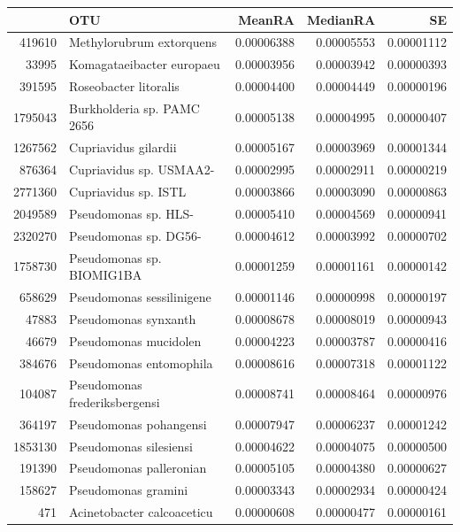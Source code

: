\begin{table}[ht]
\centering
\begin{tabular}{rlrrr}
  \hline
 & OTU & MeanRA & MedianRA & SE \\ 
  \hline
419610 & Methylorubrum extorquens & 0.00006388 & 0.00005553 & 0.00001112 \\ 
  33995 & Komagataeibacter europaeu & 0.00003956 & 0.00003942 & 0.00000393 \\ 
  391595 & Roseobacter litoralis & 0.00004400 & 0.00004449 & 0.00000196 \\ 
  1795043 & Burkholderia sp. PAMC 2656 & 0.00005138 & 0.00004995 & 0.00000407 \\ 
  1267562 & Cupriavidus gilardii & 0.00005167 & 0.00003969 & 0.00001344 \\ 
  876364 & Cupriavidus sp. USMAA2- & 0.00002995 & 0.00002911 & 0.00000219 \\ 
  2771360 & Cupriavidus sp. ISTL & 0.00003866 & 0.00003090 & 0.00000863 \\ 
  2049589 & Pseudomonas sp. HLS- & 0.00005410 & 0.00004569 & 0.00000941 \\ 
  2320270 & Pseudomonas sp. DG56- & 0.00004612 & 0.00003992 & 0.00000702 \\ 
  1758730 & Pseudomonas sp. BIOMIG1BA & 0.00001259 & 0.00001161 & 0.00000142 \\ 
  658629 & Pseudomonas sessilinigene & 0.00001146 & 0.00000998 & 0.00000197 \\ 
  47883 & Pseudomonas synxanth & 0.00008678 & 0.00008019 & 0.00000943 \\ 
  46679 & Pseudomonas mucidolen & 0.00004223 & 0.00003787 & 0.00000416 \\ 
  384676 & Pseudomonas entomophila & 0.00008616 & 0.00007318 & 0.00001122 \\ 
  104087 & Pseudomonas frederiksbergensi & 0.00008741 & 0.00008464 & 0.00000976 \\ 
  364197 & Pseudomonas pohangensi & 0.00007947 & 0.00006237 & 0.00001242 \\ 
  1853130 & Pseudomonas silesiensi & 0.00004622 & 0.00004075 & 0.00000500 \\ 
  191390 & Pseudomonas palleronian & 0.00005105 & 0.00004380 & 0.00000627 \\ 
  158627 & Pseudomonas gramini & 0.00003343 & 0.00002934 & 0.00000424 \\ 
  471 & Acinetobacter calcoaceticu & 0.00000608 & 0.00000477 & 0.00000161 \\ 

\end{tabular}
\end{table}
